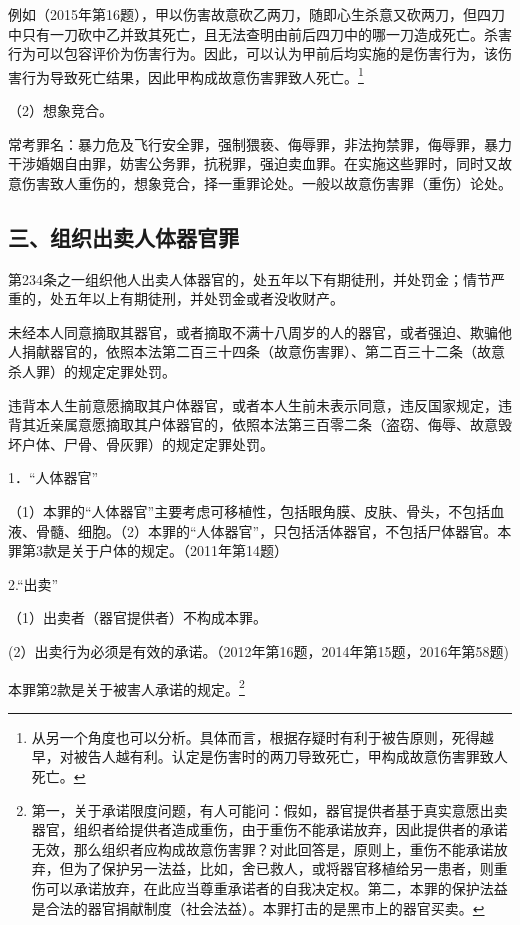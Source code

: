 例如（2015年第16题），甲以伤害故意砍乙两刀，随即心生杀意又砍两刀，但四刀中只有一刀砍中乙并致其死亡，且无法查明由前后四刀中的哪一刀造成死亡。杀害行为可以包容评价为伤害行为。因此，可以认为甲前后均实施的是伤害行为，该伤害行为导致死亡结果，因此甲构成故意伤害罪致人死亡。\footnote{从另一个角度也可以分析。具体而言，根据存疑时有利于被告原则，死得越早，对被告人越有利。认定是伤害时的两刀导致死亡，甲构成故意伤害罪致人死亡。}

（2）想象竞合。

常考罪名：暴力危及飞行安全罪，强制猥亵、侮辱罪，非法拘禁罪，侮辱罪，暴力干涉婚姻自由罪，妨害公务罪，抗税罪，强迫卖血罪。在实施这些罪时，同时又故意伤害致人重伤的，想象竞合，择一重罪论处。一般以故意伤害罪（重伤）论处。

\subsection*{三、组织出卖人体器官罪}

第234条之一组织他人出卖人体器官的，处五年以下有期徒刑，并处罚金；情节严重的，处五年以上有期徒刑，并处罚金或者没收财产。

未经本人同意摘取其器官，或者摘取不满十八周岁的人的器官，或者强迫、欺骗他人捐献器官的，依照本法第二百三十四条（故意伤害罪）、第二百三十二条（故意杀人罪）的规定定罪处罚。

违背本人生前意愿摘取其户体器官，或者本人生前未表示同意，违反国家规定，违背其近亲属意愿摘取其户体器官的，依照本法第三百零二条（盗窃、侮辱、故意毁坏户体、尸骨、骨灰罪）的规定定罪处罚。

1．“人体器官”

（1）本罪的“人体器官”主要考虑可移植性，包括眼角膜、皮肤、骨头，不包括血液、骨髓、细胞。（2）本罪的“人体器官”，只包括活体器官，不包括尸体器官。本罪第3款是关于户体的规定。（2011年第14题）

2.“出卖”

（1）出卖者（器官提供者）不构成本罪。

(2）出卖行为必须是有效的承诺。（2012年第16题，2014年第15题，2016年第58题)


本罪第2款是关于被害人承诺的规定。\footnote{第一，关于承诺限度问题，有人可能问：假如，器官提供者基于真实意愿出卖器官，组织者给提供者造成重伤，由于重伤不能承诺放弃，因此提供者的承诺无效，那么组织者应构成故意伤害罪？对此回答是，原则上，重伤不能承诺放弃，但为了保护另一法益，比如，舍已救人，或将器官移植给另一患者，则重伤可以承诺放弃，在此应当尊重承诺者的自我决定权。第二，本罪的保护法益是合法的器官捐献制度（社会法益）。本罪打击的是黑市上的器官买卖。}

